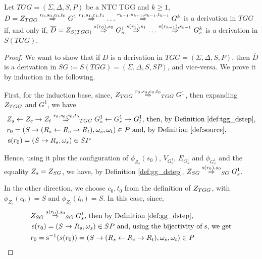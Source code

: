 \begin{theorem}
	\label{thm:one_d_enough}
	Let $TGG = (\Sigma, \Delta, S, P)$ be a NTC TGG and $k \ge 1$, \\
	$D = \startTG{TGG} \tderiv{r_0}{s_0,c_0,t_0}{} G^1 \tderiv{r_1}{s_1,c_1,t_1}{} \dots \tderiv{r_{k-1}}{s_{k-1},c_{k-1},t_{k-1}}{} G^k$ is a derivation in $TGG$ if, and only if, $\overline{D} = \startG{S(TGG)} \deriv{s(r_0)}{s_0}{} G^1_s \deriv{s(r_1)}{s_1}{} \dots \deriv{s(r_{k-1})}{s_{k-1}}{} G^k_s$ is a derivation in $S(TGG)$.
\end{theorem}
\begin{proof}
	We want to show that if $D$ is a derivation in $TGG = (\Sigma, \Delta, S, P)$, then $\overline{D}$ is a derivation in $SG := S(TGG) = (\Sigma, \Delta, S, SP)$, and vice-versa. We prove it by induction in the following.
	
	First, for the induction base, since, $\startTG{TGG} \tderiv{r_0}{s_0,c_0,t_0}{TGG} G^1$, then expanding $Z_{TGG}$ and $G^1$, we have
	\begin{align*}
		& Z_s \ms{} Z_c \mt{} Z_t \tderiv{r_0}{s_0,c_0,t_0}{TGG} G^1_s \ms{} G^1_c \mt{} G^1_t \text{, then, by Definition \ref{def:tgg_dstep},}\\
		& r_0 = (S \pro (R_s \ms{} R_c \mt{} R_t), \omega_s, \omega_t) \in P \text{ and, by Definition \ref{def:source},}\\
		& \source(r_0) = (S \pro R_s, \omega_s) \in SP
	\end{align*}
	
	Hence, using it plus the configuration of $\phi_{Z_s}(s_0)$, $V_{G^1_s}$, $E_{G^1_s}$ and $\phi_{G^1_s}$ and the equality $Z_s = Z_{SG}$, we have, by Definition \ref{def:gg_dstep}, $\startG{SG} \deriv{\source(r_0)}{s_0}{SG} G^1_s$.
	
	In the other direction, we choose $c_0, t_0$ from the definition of $Z_{TGG}$, with $\phi_{Z_c}(c_0) = S$ and  $\phi_{Z_t}(t_0) = S$. In this case, since,
	\begin{align*}
		& \startG{SG} \deriv{s(r_0)}{s_0}{SG} G^1_s \text{, then by Definition \ref{def:gg_dstep},}\\
		& \source(r_0) = (S \pro R_s, \omega_s) \in SP \text{ and, using the bijectivity of $\source$, we get}\\
		& r_0 = \source^{-1}(s(r_0)) = (S \pro (R_s \ms{} R_c \mt{} R_t), \omega_s, \omega_t) \in P
	\end{align*}
	

\end{proof}
